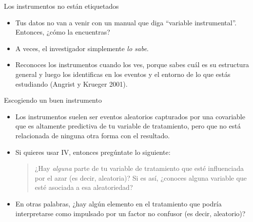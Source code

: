 \documentclass{beamer}
\begin{document}







\begin{frame}{Los instrumentos no están etiquetados}

    \begin{itemize}
        \item Tus datos no van a venir con un manual que diga ``variable instrumental''. Entonces, ¿cómo la encuentras?
        \item A veces, el investigador simplemente \emph{lo sabe}.
        \item Reconoces los instrumentos cuando los ves, porque sabes cuál es su estructura general y luego los identificas en los eventos y el entorno de lo que estás estudiando (Angrist y Krueger 2001).
    \end{itemize}
\end{frame}


\begin{frame}{Escogiendo un buen instrumento}

    \begin{itemize}
        \item Los instrumentos suelen ser eventos aleatorios capturados por una covariable que es altamente predictiva de tu variable de tratamiento, pero que no está relacionada de ninguna otra forma con el resultado.
        \item Si quieres usar IV, entonces pregúntate lo siguiente: 
            \begin{quote}
            ¿Hay \emph{alguna} parte de tu variable de tratamiento que esté influenciada por el azar (es decir, aleatoria)? Si es así, ¿conoces alguna variable que esté asociada a esa aleatoriedad?
            \end{quote}
        \item En otras palabras, ¿hay algún elemento en el tratamiento que podría interpretarse como impulsado por un factor no confusor (es decir, aleatorio)?
    \end{itemize}
\end{frame}
\end{document}
